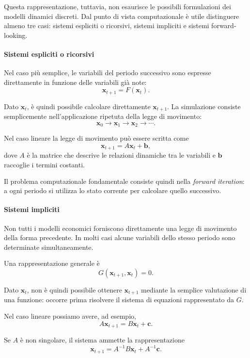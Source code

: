 \documentclass{book}
\begin{document}
Questa rappresentazione, tuttavia, non esaurisce le possibili
formulazioni dei modelli dinamici discreti. Dal punto di vista
computazionale è utile distinguere almeno tre casi: sistemi espliciti
o ricorsivi, sistemi impliciti e sistemi forward-looking.

\paragraph{Sistemi espliciti o ricorsivi}

Nel caso più semplice, le variabili del periodo successivo sono
espresse direttamente in funzione delle variabili già note:
\[
\mathbf{x}_{t+1}=F(\mathbf{x}_t).
\]

Dato $\mathbf{x}_t$, è quindi possibile calcolare direttamente
$\mathbf{x}_{t+1}$. La simulazione consiste semplicemente
nell'applicazione ripetuta della legge di movimento:
\[
\mathbf{x}_0
\rightarrow
\mathbf{x}_1
\rightarrow
\mathbf{x}_2
\rightarrow\cdots.
\]

Nel caso lineare la legge di movimento può essere scritta come
\[
\mathbf{x}_{t+1}
=
A\mathbf{x}_t+\mathbf{b},
\]
dove $A$ è la matrice che descrive le relazioni dinamiche tra le
variabili e $\mathbf{b}$ raccoglie i termini costanti.

Il problema computazionale fondamentale consiste quindi nella
\emph{forward iteration}: a ogni periodo si utilizza lo stato corrente
per calcolare quello successivo.

\paragraph{Sistemi impliciti}

Non tutti i modelli economici forniscono direttamente una legge di
movimento della forma precedente. In molti casi alcune variabili dello
stesso periodo sono determinate simultaneamente.

Una rappresentazione generale è
\[
G(\mathbf{x}_{t+1},\mathbf{x}_t)=0.
\]

Dato $\mathbf{x}_t$, non è quindi possibile ottenere
$\mathbf{x}_{t+1}$ mediante la semplice valutazione di una funzione:
occorre prima risolvere il sistema di equazioni rappresentato da $G$.

Nel caso lineare possiamo avere, ad esempio,
\[
A\mathbf{x}_{t+1}
=
B\mathbf{x}_t+\mathbf{c}.
\]

Se $A$ è non singolare, il sistema ammette la rappresentazione
\[
\mathbf{x}_{t+1}
=
A^{-1}B\mathbf{x}_t+A^{-1}\mathbf{c}.
\]
\end{document}

